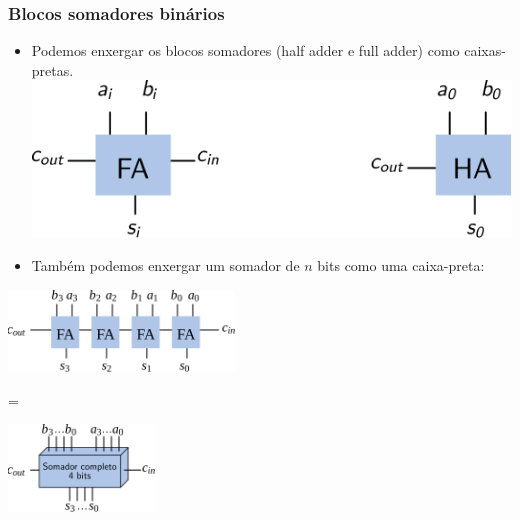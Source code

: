\documentclass{beamer}
\begin{document}
\begin{frame}
\frametitle{Blocos somadores binários}

\begin{itemize}
\item Podemos enxergar os blocos somadores (half adder e full adder)
como caixas-pretas.\\
\includegraphics{images/ripple_carry}
\pause
\item Também podemos enxergar um somador de $n$ bits como uma
caixa-preta:
\end{itemize}
\begin{minipage}{60mm}
\includegraphics[width=60mm]{images/fulladder_4bits}
\end{minipage}
\hfill
{\Huge =}
\hfill
\begin{minipage}{39mm}
\includegraphics[width=39mm]{images/fulladder_4bits_blackbox}
\end{minipage}

\end{frame}

\end{document}
